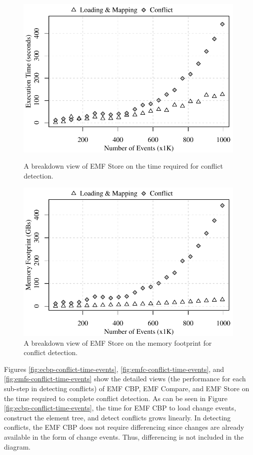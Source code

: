 \begin{figure}[]
\begin{minipage}[b]{0.490\textwidth}
	\includegraphics[width=\linewidth]{emfs-conflict-time-events}
	\caption{A breakdown view of EMF Store on the time required for conflict detection.}
	\label{fig:emfs-conflict-time-events}
\end{minipage}
\hfill
\begin{minipage}[b]{0.490\textwidth}
	\includegraphics[width=\linewidth]{emfs-conflict-memory-events}
	\caption{A breakdown view of EMF Store on the memory footprint for conflict detection.}
	\label{fig:emfs-conflict-memory-events}
\end{minipage}
\end{figure}

Figures \ref{fig:ecbp-conflict-time-events}, \ref{fig:emfc-conflict-time-events}, and \ref{fig:emfs-conflict-time-events} show the detailed views (the performance for each sub-step in detecting conflicts) of EMF CBP, EMF Compare, and EMF Store on the time required to complete conflict detection. As can be seen in Figure \ref{fig:ecbp-conflict-time-events}, the time for EMF CBP to load change events, construct the element tree, and detect conflicts grows linearly. In detecting conflicts, the EMF CBP does not require differencing since changes are already available in the form of change events. Thus, differencing is not included in the diagram. 

